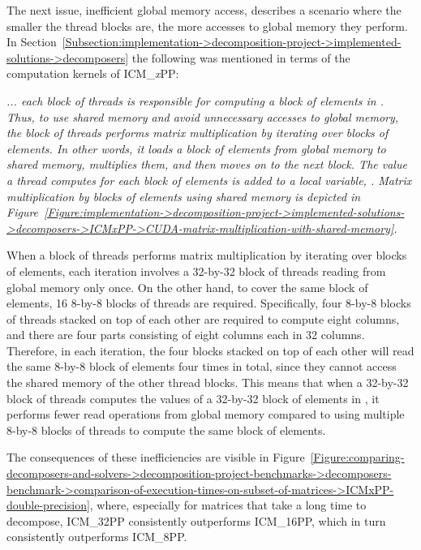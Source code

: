The next issue, inefficient global memory access, describes a scenario where the smaller the thread blocks are, the more accesses to global memory they perform.
In Section~\ref{Subsection:implementation->decomposition-project->implemented-solutions->decomposers} the following was mentioned in terms of the computation kernels of ICM\_\textit{x}PP:

\begin{quoting}
\textit{... each block of threads is responsible for computing a block of elements in .
Thus, to use shared memory and avoid unnecessary accesses to global memory, the block of threads performs matrix multiplication by iterating over blocks of elements.
In other words, it loads a block of elements from global memory to shared memory, multiplies them, and then moves on to the next block.
The value a thread computes for each block of elements is added to a local variable, .
Matrix multiplication by blocks of elements using shared memory is depicted in Figure~\ref{Figure:implementation->decomposition-project->implemented-solutions->decomposers->ICMxPP->CUDA-matrix-multiplication-with-shared-memory}.}
\end{quoting}

When a block of threads performs matrix multiplication by iterating over blocks of elements, each iteration involves a 32-by-32 block of threads reading from global memory only once.
On the other hand, to cover the same block of elements, 16 8-by-8 blocks of threads are required.
Specifically, four 8-by-8 blocks of threads stacked on top of each other are required to compute eight columns, and there are four parts consisting of eight columns each in 32 columns.
Therefore, in each iteration, the four blocks stacked on top of each other will read the same 8-by-8 block of elements four times in total, since they cannot access the shared memory of the other thread blocks.
This means that when a 32-by-32 block of threads computes the values of a 32-by-32 block of elements in , it performs fewer read operations from global memory compared to using multiple 8-by-8 blocks of threads to compute the same block of elements.

The consequences of these inefficiencies are visible in Figure~\ref{Figure:comparing-decomposers-and-solvers->decomposition-project-benchmarks->decomposers-benchmark->comparison-of-execution-times-on-subset-of-matrices->ICMxPP-double-precision}, where, especially for matrices that take a long time to decompose, ICM\_32PP consistently outperforms ICM\_16PP, which in turn consistently outperforms ICM\_8PP.\label{Text:comparing-decomposers-and-solvers->decomposition-project-benchmarks->decomposers-benchmark->comparison-of-execution-times-on-subset-of-matrices->ICMxPP->performance-of-variants}

